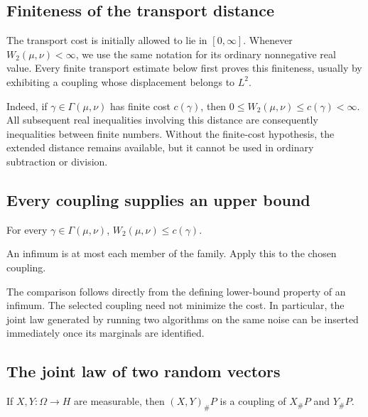\documentclass[11pt,a4paper]{report}
\begin{document}
\subsection{\texorpdfstring{Finiteness of the transport distance}{Finiteness of the transport distance}}
\label{report-step-UnadjustedLangevin-Coupling-lean-4}


The transport cost is initially allowed to lie in \([0,\infty]\). Whenever \(W_2(\mu,\nu)<\infty\), we use the same notation for its ordinary nonnegative real value. Every finite transport estimate below first proves this finiteness, usually by exhibiting a coupling whose displacement belongs to \(L^2\).



Indeed, if \(\gamma\in\Gamma(\mu,\nu)\) has finite cost \(c(\gamma)\), then \(0\le W_2(\mu,\nu)\le c(\gamma)<\infty\). All subsequent real inequalities involving this distance are consequently inequalities between finite numbers. Without the finite-cost hypothesis, the extended distance remains available, but it cannot be used in ordinary subtraction or division.

\subsection{\texorpdfstring{Every coupling supplies an upper bound}{Every coupling supplies an upper bound}}
\label{report-step-UnadjustedLangevin-Coupling-lean-5}


For every \(\gamma\in\Gamma(\mu,\nu)\), \(W_2(\mu,\nu)\le c(\gamma)\).



An infimum is at most each member of the family. Apply this to the chosen coupling.



The comparison follows directly from the defining lower-bound property of an infimum. The selected coupling need not minimize the cost. In particular, the joint law generated by running two algorithms on the same noise can be inserted immediately once its marginals are identified.

\subsection{\texorpdfstring{The joint law of two random vectors}{The joint law of two random vectors}}
\label{report-step-UnadjustedLangevin-Coupling-lean-6}


If \(X,Y:\Omega\to H\) are measurable, then \((X,Y)_\#P\) is a coupling of \(X_\#P\) and \(Y_\#P\).
\end{document}
